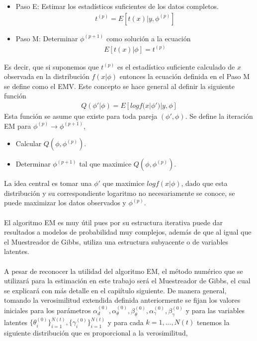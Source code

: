 \begin{itemize}
\item Paso E: Estimar los estad\'isticos suficientes de los datos completos.
	\begin{align*}
	t^{(p)}=E[t(x)|y,\phi^{(p)}]
	\end{align*}
\item Paso M: Determinar $\phi^{(p+1)}$ como soluci\'on a la ecuaci\'on
	\begin{align*}
	E[t(x)|\phi]=t^{(p)}
	\end{align*}
\end{itemize}
Es decir, que si suponemos que $t^{(p)}$ es el estad\'istico suficiente calculado de $x$ observada en la distribuci\'on $f(x|\phi)$ entonces la ecuaci\'on definida en el Paso M se define como el EMV. Este concepto se hace general al definir la siguiente funci\'on
\begin{align*}
Q(\phi'|\phi)=E[log f(x|\phi')|y,\phi]
\end{align*}
Esta funci\'on se asume que existe para toda pareja $(\phi',\phi)$. Se define la iteraci\'on EM para $\phi^{(p)} \to \phi^{(p+1)}$,
\begin{itemize}
\item Calcular $Q(\phi,\phi^{(p)})$.
\item Determinar $\phi^{(p+1)}$ tal que maximice $Q(\phi,\phi^{(p)})$.
\end{itemize}
La idea central es tomar una $\phi'$ que maximice $log f(x|\phi)$, dado que esta distribuci\'on y su correspondiente logaritmo no necesariamente se conoce, se puede maximizar los datos observados y $\phi^{(p)}$.\\
\\
El algoritmo EM es muy \'util pues por su estructura iterativa puede dar resultados a modelos de probabilidad muy complejos, adem\'as de que al igual que el Muestreador de Gibbs, utiliza una estructura subyacente o de variables latentes.\\
\\
A pesar de reconocer la utilidad del algoritmo EM, el m\'etodo num\'erico que se utilizar\'a para la estimaci\'on en este trabajo ser\'a el Muestreador de Gibbs, el cual se explicar\'a con m\'as detalle en el capi\'itulo siguiente. De manera general, tomando la verosimilitud extendida definida anteriormente se fijan los valores iniciales para los par\'ametros $\alpha_d^{(0)},\alpha_\theta^{(0)},\beta_\theta^{(0)},\alpha_\gamma^{(0)},\beta_\gamma^{(0)}$ y para las variables latentes $\{\theta_i^{(0)}\}_{i=1}^{N(t)},\{\gamma_i^{(0)}\}_{i=1}^{N(t)}$ y para cada $k=1,...,N(t)$ tenemos la siguiente distribuci\'on que es proporcional a la verosimilitud,
